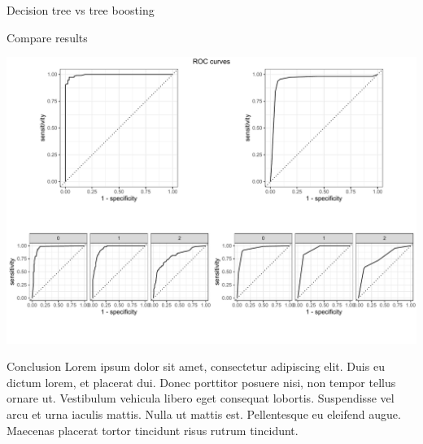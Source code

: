 \documentclass[
  ignorenonframetext,
]{article}
\begin{document}
\begin{frame}[fragile]{Decision tree vs tree boosting}
\begin{block}{Compare results}
\begin{center}\includegraphics{_main_files/figure-beamer/unnamed-chunk-61-1} \end{center}
\end{block}

\begin{block}{Conclusion}
\protect\hypertarget{conclusion-3}{}
Lorem ipsum dolor sit amet, consectetur adipiscing elit. Duis eu dictum lorem, et placerat dui. Donec porttitor posuere nisi, non tempor tellus ornare ut. Vestibulum vehicula libero eget consequat lobortis. Suspendisse vel arcu et urna iaculis mattis. Nulla ut mattis est. Pellentesque eu eleifend augue. Maecenas placerat tortor tincidunt risus rutrum tincidunt.
\end{block}
\end{frame}
\end{document}
